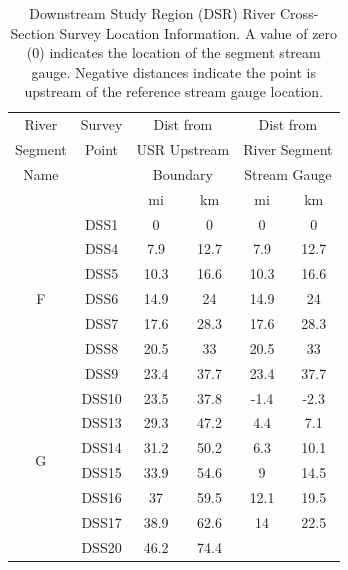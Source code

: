 \begin{linenumbers}
\begin{table}[htbp]
	\centering
	\caption[Downstream Study Region (DSR) River Cross-Section Survey Location Information.]{Downstream Study Region (DSR) River Cross-Section Survey Location Information.  A value of zero (0) indicates the location of the segment stream gauge.  Negative distances indicate the point is upstream of the reference stream gauge location.}
	\label{tab:DSRSurveyLoc}
	\begin{tabular}{cccccc}
		\toprule
		River                        & Survey &  \multicolumn{2}{c}{Dist from}   &   \multicolumn{2}{c}{Dist from}   \\
		Segment                       & Point  & \multicolumn{2}{c}{USR Upstream} & \multicolumn{2}{c}{River Segment} \\
		Name                         &        &   \multicolumn{2}{c}{Boundary}   & \multicolumn{2}{c}{Stream Gauge}  \\
		\cmidrule(r{0.5em}l){3-4} \cmidrule(r{0.5em}l){5-6} &        &  mi  &            km             &  mi  &             km             \\ \toprule
		\multirow{7}{*}{F}                  &  DSS1  &  0   &             0             &  0   &             0              \\
		&  DSS4  & 7.9  &           12.7            & 7.9  &            12.7            \\
		&  DSS5  & 10.3 &           16.6            & 10.3 &            16.6            \\
		&  DSS6  & 14.9 &            24             & 14.9 &             24             \\
		&  DSS7  & 17.6 &           28.3            & 17.6 &            28.3            \\
		&  DSS8  & 20.5 &            33             & 20.5 &             33             \\
		&  DSS9  & 23.4 &           37.7            & 23.4 &            37.7            \\ \midrule
		\multirow{6}{*}{G}                  & DSS10  & 23.5 &           37.8            & -1.4 &            -2.3            \\
		& DSS13  & 29.3 &           47.2            & 4.4  &            7.1             \\
		& DSS14  & 31.2 &           50.2            & 6.3  &            10.1            \\
		& DSS15  & 33.9 &           54.6            &  9   &            14.5            \\
		& DSS16  &  37  &           59.5            & 12.1 &            19.5            \\
		& DSS17  & 38.9 &           62.6            &  14  &            22.5            \\ \midrule
		& DSS20  & 46.2 &           74.4            &      &  \\ \bottomrule
	\end{tabular}
\end{table}


\end{linenumbers}
